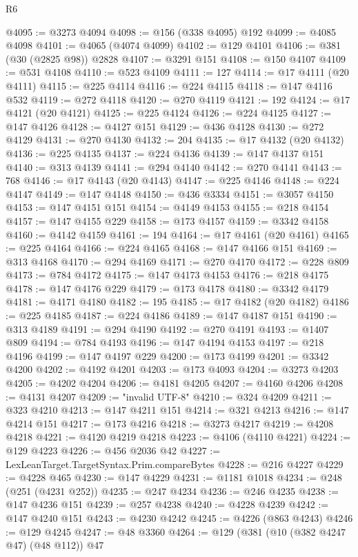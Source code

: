 \begin{lexlean}{R6}
\begin{coremodule}
@4095 := @3273 @4094
@4098 := @156 (@338 @4095) @192
@4099 := @4085 @4098
@4101 := @4065 (@4074 @4099)
@4102 := @129 @4101
@4106 := @381 (@30 (@2825 @98)) @2828
@4107 := @3291 @151
@4108 := @150 @4107
@4109 := @531 @4108
@4110 := @523 @4109
@4111 := 127
@4114 := @17 @4111 (@20 @4111)
@4115 := @225 @4114
@4116 := @224 @4115
@4118 := @147 @4116 @532
@4119 := @272 @4118
@4120 := @270 @4119
@4121 := 192
@4124 := @17 @4121 (@20 @4121)
@4125 := @225 @4124
@4126 := @224 @4125
@4127 := @147 @4126
@4128 := @4127 @151
@4129 := @436 @4128
@4130 := @272 @4129
@4131 := @270 @4130
@4132 := 204
@4135 := @17 @4132 (@20 @4132)
@4136 := @225 @4135
@4137 := @224 @4136
@4139 := @147 @4137 @151
@4140 := @313 @4139
@4141 := @294 @4140
@4142 := @270 @4141
@4143 := 768
@4146 := @17 @4143 (@20 @4143)
@4147 := @225 @4146
@4148 := @224 @4147
@4149 := @147 @4148
@4150 := @436 @3334
@4151 := @3057 @4150
@4153 := @147 @4151 @151
@4154 := @4149 @4153
@4155 := @218 @4154
@4157 := @147 @4155 @229
@4158 := @173 @4157
@4159 := @3342 @4158
@4160 := @4142 @4159
@4161 := 194
@4164 := @17 @4161 (@20 @4161)
@4165 := @225 @4164
@4166 := @224 @4165
@4168 := @147 @4166 @151
@4169 := @313 @4168
@4170 := @294 @4169
@4171 := @270 @4170
@4172 := @228 @809
@4173 := @784 @4172
@4175 := @147 @4173 @4153
@4176 := @218 @4175
@4178 := @147 @4176 @229
@4179 := @173 @4178
@4180 := @3342 @4179
@4181 := @4171 @4180
@4182 := 195
@4185 := @17 @4182 (@20 @4182)
@4186 := @225 @4185
@4187 := @224 @4186
@4189 := @147 @4187 @151
@4190 := @313 @4189
@4191 := @294 @4190
@4192 := @270 @4191
@4193 := @1407 @809
@4194 := @784 @4193
@4196 := @147 @4194 @4153
@4197 := @218 @4196
@4199 := @147 @4197 @229
@4200 := @173 @4199
@4201 := @3342 @4200
@4202 := @4192 @4201
@4203 := @173 @4093
@4204 := @3273 @4203
@4205 := @4202 @4204
@4206 := @4181 @4205
@4207 := @4160 @4206
@4208 := @4131 @4207
@4209 := "invalid UTF-8"
@4210 := @324 @4209
@4211 := @323 @4210
@4213 := @147 @4211 @151
@4214 := @321 @4213
@4216 := @147 @4214 @151
@4217 := @173 @4216
@4218 := @3273 @4217
@4219 := @4208 @4218
@4221 := @4120 @4219 @4218
@4223 := @4106 (@4110 @4221)
@4224 := @129 @4223
@4226 := @456 @2036 @42
@4227 := LexLeanTarget.TargetSyntax.Prim.compareBytes
@4228 := @216 @4227
@4229 := @4228 @465
@4230 := @147 @4229
@4231 := @1181 @1018
@4234 := @248 (@251 (@4231 @252))
@4235 := @247 @4234
@4236 := @246 @4235
@4238 := @147 @4236 @151
@4239 := @257 @4238
@4240 := @4228 @4239
@4242 := @147 @4240 @151
@4243 := @4230 @4242
@4245 := @4226 (@863 @4243)
@4246 := @129 @4245
@4247 := @48 @3360
@4264 := @129
    (@381
      (@10 (@382 @4247 @47) (@48 @112))
      @47

\end{coremodule}
\end{lexlean}
